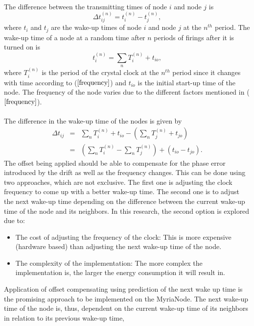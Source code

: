 \documentclass[a4paper,10pt]{report}
\begin{document}
\paragraph*{}
The difference between the transmitting times of node $i$ and node $j$ is
\begin{equation}
\Delta t_{ij}^{(n)} = t_i^{(n)} - t_j^{(n)} ,
\end{equation}
where $t_i$ and $t_j$ are the wake-up times of node $i$ and node $j$ at the $n^{th}$ period. The wake-up time of a node at a random time
after $n$ periods of firings after it is turned on is
\begin{equation}
t_i^{(n)} = \sum_{n} T_i^{(n)} + t_{io},
\end{equation}
where  $T_i^{(n)}$ is the period of the crystal clock at the $n^{th}$ period since it changes with time according to
($\ref{frequency}$) and $t_{io}$ is the initial start-up time of the node. The frequency of the node varies due to the different factors
mentioned in ($\ref{frequency}$). \paragraph*{}
The difference in the wake-up time of the nodes is given by
\begin{eqnarray}
\Delta t_{ij} & = & \sum_{n}T_i^{(n)} + t_{io}- (\sum_{n}T_j^{(n)} +
t_{jo}) \\ &=& (\sum_{n}T_i^{(n)} - \sum_{n}T_j^{(n)}) +
(t_{io}-t_{jo}).
\end{eqnarray}
The offset being applied should be able to compensate for the phase error introduced by the drift as well as the frequency changes. This
can be done using two approaches, which are not exclusive. The first one is adjusting the clock frequency to come up with a better
wake-up time. The second one is to adjust the next wake-up time depending on the difference between the current wake-up time of the
node and its neighbors. In this research, the second option is explored due to:
\begin{itemize}
\item The cost of adjusting the frequency of the clock: This is more expensive (hardware based) than adjusting the next wake-up time of the node.
\item The complexity of the implementation: The more complex the implementation is, the larger the energy consumption it will result in.
\end{itemize}
Application of offset compensating using prediction of the next wake up time is the promising approach to be implemented on the MyriaNode. The next wake-up time of the node is, thus, dependent on the current wake-up time of its neighbors in relation to its previous wake-up time,
\end{document}
